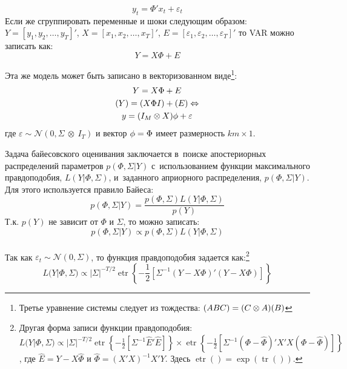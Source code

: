 \documentclass[11pt]{article} %
\DeclareMathOperator{\etr}{etr}
\DeclareMathOperator{\tr}{tr}
\newcommand{\cN}{\mathcal{N}}
\let\vec\relax
\DeclareMathOperator{\vec}{vec}
\begin{document}
\begin{equation}
y_t=\Phi' x_t+\varepsilon_t
\end{equation}
Если же сгруппировать переменные  и шоки следующим образом: $Y=[y_1, y_2,\ldots, y_T]'$, $X=[x_1, x_2,\ldots, x_T]'$, $E=[\varepsilon_1, \varepsilon_2,\ldots, \varepsilon_T]'$ то VAR можно записать как:
\begin{equation}
Y=X\Phi+E\label{var}
\end{equation}

Эта же модель может быть записано в векторизованном виде\footnote{Третье уравнение системы следует из тождества: $\vec(ABC)=(C\otimes A)\vec (B)$}:
\begin{gather}
Y=X\Phi+E\\
\vec(Y)=\vec(X\Phi I)+\vec(E)\Leftrightarrow \\
y=(I_M\otimes X)\phi + \varepsilon \label{var2}
\end{gather}
где $\varepsilon  \sim \cN(0,\Sigma\ \otimes\ I_T)$ и вектор $\phi=\vec{\Phi}$ имеет размерность $km\times 1$.

Задача байесовского оценивания заключается в~поиске апостериорных распределений параметров $p(\Phi, \Sigma|Y)$ с~использованием функции максимального правдоподобия, $L(Y|\Phi, \Sigma)$, и~заданного априорного распределения, $p(\Phi, \Sigma|Y)$. Для этого используется правило Байеса:
\begin{equation}
p(\Phi, \Sigma|Y)=\frac{p(\Phi,\Sigma) L(Y|\Phi,\Sigma)}{p(Y)}
\end{equation}
Т.к. $p(Y)$ не зависит от $\Phi$ и $\Sigma$, то можно записать: 
\begin{equation}
p(\Phi, \Sigma|Y)\propto p(\Phi,\Sigma) L(Y|\Phi,\Sigma)
\end{equation}\\
Так как $\varepsilon_t\sim \cN(0,\Sigma)$, то функция правдоподобия задается как:\footnote{ Другая форма записи функции правдоподобия: $L(Y|\Phi, \Sigma) \propto |\Sigma|^{-T/2}\etr\left\lbrace -\frac{1}{2}  \left[\Sigma^{-1} \hat E' \hat E\right]\right\rbrace \times \etr\left\lbrace -\frac{1}{2}  \left[\Sigma^{-1}(\Phi-\hat\Phi)'X'X(\Phi-\hat\Phi)\right]\right\rbrace$, где $\hat E=Y-X\hat\Phi$ и $\hat \Phi=(X'X)^{-1}X'Y$. Здесь $\etr()=\exp(\tr())$. }
\begin{equation}
L(Y|\Phi, \Sigma) \propto |\Sigma|^{-T/2}\etr\left\lbrace -\frac{1}{2}  \left[\Sigma^{-1}(Y-X\Phi)'(Y-X\Phi)\right]\right\rbrace\label{likelihood}
\end{equation}
\end{document}
